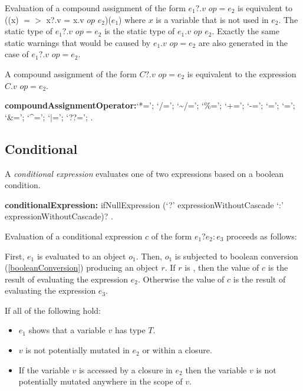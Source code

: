 \documentclass{article}
\newcommand{\code}[1]{{\sf #1}}
\begin{document}
\begin{itemize}
\LMHash{}
Evaluation of a compound assignment of the form $e_1?.v$ $op = e_2$ is equivalent to \code{((x) $=>$ x?.v = x.v $op$ $e_2$)($e_1$)} where $x$ is a variable that is not used in $e_2$. The static type of $e_1?.v$ $op = e_2$ is the static type of $e_1.v$ $op$ $e_2$. Exactly the same static warnings that would be caused by $e_1.v$ $op = e_2$ are also generated in the case of $e_1?.v$ $op = e_2$.

\LMHash{}
A compound assignment of the form $C?.v$ $op = e_2$ is equivalent to the expression
$C.v$ $op = e_2$.

\begin{grammar}
{\bf compoundAssignmentOperator:}`*=';
      `/=';
      `\~{}/=';
      `\%=';
      `+=';
      `-=';
      `{\escapegrammar \lt \lt}=';
       `{\escapegrammar \gt \gt}=';
      `\&=';
      `\^{}=';
      `$|$=';
      `??=';
    .
\end{grammar}


\subsection{ Conditional}

\LMHash{}
A {\em conditional expression} evaluates one of two expressions based on a boolean condition.

\begin{grammar}
  {\bf conditionalExpression:}
     ifNullExpression (`?' expressionWithoutCascade `{\escapegrammar :}' expressionWithoutCascade)?
    . %
\end{grammar}

\LMHash{}
Evaluation of a conditional expression $c$ of the form $e_1 ? e_2 : e_3$ proceeds as follows:

\LMHash{}
First, $e_1$ is evaluated to an object $o_1$.  Then, $o_1$ is  subjected to boolean conversion (\ref{booleanConversion}) producing an object $r$.  If $r$ is \TRUE, then the value of $c$ is the result of evaluating the expression $e_2$. Otherwise the value of $c$ is the result of evaluating the expression $e_3$.

\LMHash{}
If all of the following hold:
\begin{itemize}
\item $e_1$ shows that a variable $v$ has type $T$.
\item $v$ is not potentially mutated in $e_2$ or within a closure.
\item If the variable $v$ is accessed by a closure in $e_2$ then the variable $v$ is not potentially mutated anywhere in the scope of $v$.
\end{itemize}


\end{itemize}
\end{document}
